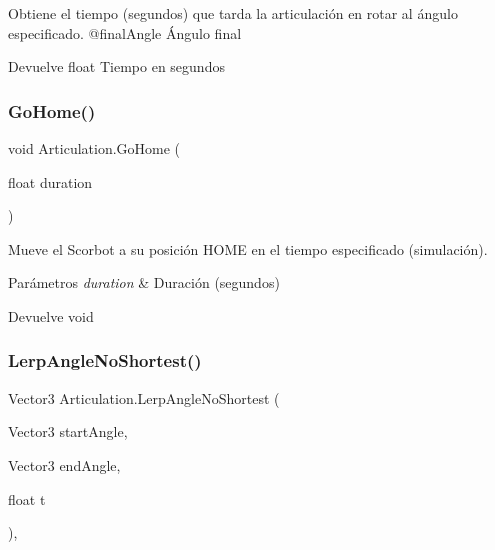 Obtiene el tiempo (segundos) que tarda la articulación en rotar al ángulo especificado. @final\+Angle Ángulo final \begin{DoxyReturn}{Devuelve}
float Tiempo en segundos 
\end{DoxyReturn}
\mbox{\label{class_articulation_abe8a64163ae7fda2bcae5035ad1bfb75}} 
\subsubsection{\texorpdfstring{GoHome()}{GoHome()}}
{\footnotesize\ttfamily void Articulation.\+Go\+Home (\begin{DoxyParamCaption}\item[{float}]{duration }\end{DoxyParamCaption})\hspace{0.3cm}{\ttfamily [inline]}}

Mueve el Scorbot a su posición H\+O\+ME en el tiempo especificado (simulación). 
\begin{DoxyParams}{Parámetros}
{\em duration} & Duración (segundos) \\
\hline
\end{DoxyParams}
\begin{DoxyReturn}{Devuelve}
void 
\end{DoxyReturn}
\mbox{\label{class_articulation_a434d6e06e4387f7b0c3feb445895cfea}} 
\subsubsection{\texorpdfstring{LerpAngleNoShortest()}{LerpAngleNoShortest()}}
{\footnotesize\ttfamily Vector3 Articulation.\+Lerp\+Angle\+No\+Shortest (\begin{DoxyParamCaption}\item[{Vector3}]{start\+Angle,  }\item[{Vector3}]{end\+Angle,  }\item[{float}]{t }\end{DoxyParamCaption})\hspace{0.3cm}{\ttfamily [inline]}, {\ttfamily [private]}}

